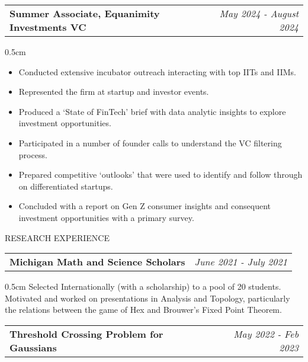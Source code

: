 \documentclass[10pt]{article}
\newenvironment{myenv}{\begin{adjustwidth}{0.5cm}{}}{\end{adjustwidth}}
\begin{document}
\noindent
\begin{tabularx}{\linewidth}{Xr}
\textbf{Summer Associate, Equanimity Investments VC} & \textit{May 2024 - August 2024} \\
\end{tabularx}
\begin{myenv}
\begin{itemize}
\itemsep 1mm
    \item Conducted extensive incubator outreach interacting with top IITs and IIMs.
    \item Represented the firm at startup and investor events.
    \item Produced a ‘State of FinTech’ brief with data analytic insights to explore investment opportunities.
    \item Participated in a number of founder calls to understand the VC filtering process.
    \item Prepared competitive ‘outlooks’ that were used to identify and follow through on differentiated startups.
    \item Concluded with a report on Gen Z consumer insights and consequent investment opportunities with a primary survey.
\end{itemize}
\end{myenv}

\bigskip
\noindent\vspace{3pt}
{\large \textcolor{bluetwo}{RESEARCH EXPERIENCE}}
\vspace{3pt}
\hline
\vspace{6pt}

\noindent
\begin{tabularx}{\linewidth}{Xr}
\textbf{Michigan Math and Science Scholars} & \textit{June 2021 - July 2021} \\
\end{tabularx}

\begin{myenv}
Selected Internationally (with a scholarship) to a pool of 20 students. Motivated and worked on presentations in Analysis and Topology, particularly the relations between the game of Hex and Brouwer’s Fixed Point Theorem.
\end{myenv}

\smallskip

\noindent
\begin{tabularx}{\linewidth}{Xr}
\textbf{Threshold Crossing Problem for Gaussians} & \textit{May 2022 - Feb 2023} \\
\end{tabularx}
\end{document}
